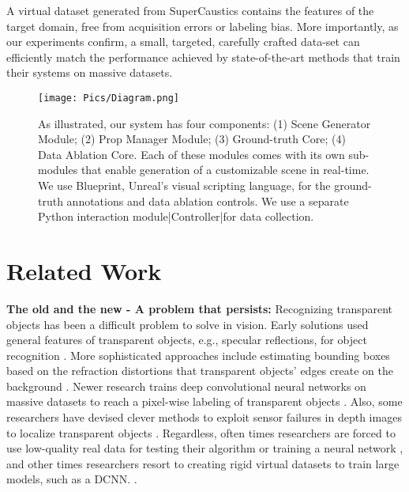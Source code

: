 \documentclass[conference]{IEEEtran}
\begin{document}
A virtual dataset generated from SuperCaustics contains the features of the target domain, free from acquisition errors or labeling bias. More importantly, as our experiments confirm, a small, targeted, carefully crafted data-set can efficiently match the performance achieved by state-of-the-art methods that train their systems on massive datasets.



\begin{figure*}

 \center

  \texttt{[image: Pics/Diagram.png]}

  \caption{As illustrated, our system has four components: (1) Scene Generator Module; (2) Prop Manager Module; (3) Ground-truth Core; (4) Data Ablation Core. Each of these modules comes with its own sub-modules that enable generation of a customizable scene in real-time. We use Blueprint, Unreal's visual scripting language, for the ground-truth annotations and data ablation controls. We use a separate Python interaction module|Controller|for data collection. }

  \label{Diagram}

\end{figure*}

\section{Related Work}\label{sec:related}
\noindent\textbf{The old and the new - A problem that persists: }Recognizing transparent objects has been a difficult problem to solve in vision. Early solutions used general features of transparent objects, e.g., specular reflections, for object recognition \cite{specular}. More sophisticated approaches include estimating bounding boxes based on the refraction distortions that transparent objects' edges create on the background \cite{additive}. Newer research trains deep convolutional neural networks on massive datasets to reach a pixel-wise labeling of transparent objects \cite{cleargrasp, LocalImplicit}. Also, some researchers have devised clever methods to exploit sensor failures in depth images to localize transparent objects \cite{friendorfoe}. Regardless, often times researchers are forced to use low-quality real data for testing their algorithm or training a neural network \cite{cleargrasp,additive}, and other times researchers resort to creating rigid virtual datasets to train large models, such as a DCNN. \cite{LocalImplicit,friendorfoe,cleargrasp}.\\
\end{document}
